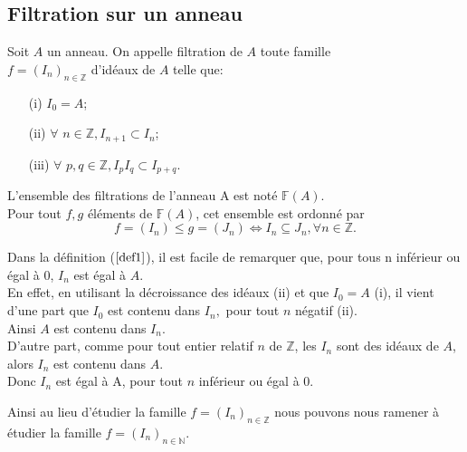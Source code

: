 \subsection{Filtration sur un anneau}
\begin{madefinition}
	\label{def1}
	Soit $A$ un anneau. On appelle filtration de $A$ toute famille\\ $f = (I_n)_{n \in \mathbb{Z}}$ d'idéaux de $A$ telle que:
	\begin{enumerate}
		\item[(i)] $I_0 = A$;
		\item[(ii)] $ \forall $  $n \in \mathbb{Z}, I_{n+1} \subset I_n$;
		\item[(iii)] $ \forall $  $p,q \in \mathbb{Z}, I_pI_q \subset I_{p+q}$.
	\end{enumerate}
	L'ensemble des filtrations de l'anneau A est noté $\mathbb{F}(A)$.\\
	Pour tout  $f,g$ éléments de $\mathbb{F}(A)$, cet ensemble est ordonné par
	\[f = (I_n) \leqslant g = (J_n) \Longleftrightarrow  I_n \subseteq J_n , \forall n \in \mathbb{Z}.\]
\end{madefinition}
\begin{maremarque}
	Dans la définition ($\ref{def1}$), il est facile de remarquer que, pour tous n inférieur ou égal à 0, $I_n$ est égal à $A$.\\ En effet, en utilisant la décroissance des idéaux (ii) et que $I_0 = A$ (i), il vient d'une part que $I_0$ est contenu dans $I_n ,$ pour tout $n $ négatif (ii). \\ Ainsi $A$ est contenu dans $ I_n$.\\
	D'autre part, comme pour tout entier relatif $ n$ de $\mathbb{Z}$, les $I_n$ sont des idéaux de $A$, alors $I_n$ est contenu dans $A$.\\
	Donc $I_n$ est égal à A, pour tout $ n$ inférieur ou égal à $0$.
\end{maremarque}
Ainsi au lieu d'étudier la famille $f = (I_n)_{n \in \mathbb{Z}}$ nous pouvons nous ramener à étudier la famille $f = (I_n)_{n \in \mathbb{N}}$.

